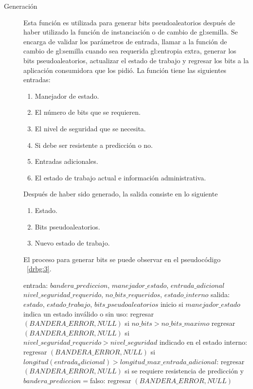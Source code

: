 \begin{description}
  \item [Generación] Esta función es utilizada para generar bits
    pseudoaleatorios después de haber utilizado la función de instanciación o
    de cambio de \gls{gl:semilla}. Se encarga de validar los parámetros de
    entrada, llamar a la función de cambio de \gls{gl:semilla} cuando sea
    requerida \gls{gl:entropia} extra, generar los bits pseudoaleatorios,
    actualizar el estado de trabajo y regresar los bits a la aplicación
    consumidora que los pidió. La función tiene las siguientes entradas:
    \begin{enumerate}
      \item Manejador de estado.
      \item El número de bits que se requieren.
      \item El nivel de seguridad que se necesita.
      \item Si debe ser resistente a predicción o no.
      \item Entradas adicionales.
      \item El estado de trabajo actual e información administrativa.
    \end{enumerate}
    Después de haber sido generado, la salida consiste en lo siguiente
    \begin{enumerate}
      \item Estado.
      \item Bits pseudoaleatorios.
      \item Nuevo estado de trabajo.
    \end{enumerate}
    El proceso para generar bits se puede observar en el pseudocódigo
   ~\ref{drbg:3}.
\begin{pseudocodigo}[caption={DRBG, generación.}, label={drbg:3}]
    entrada:  $bandera\_prediccion$, $manejador\_estado$, $entrada\_adicional$
              $nivel\_seguridad\_requerido$, $no\_bits\_requeridos$, $estado\_interno$
    salida:   $estado$, $estado\_trabajo$, $bits\_pseudoaleatorios$
    inicio
      si $manejador\_estado$ indica un estado inválido o sin uso:
        regresar $(BANDERA\_ERROR, NULL)$
      si $no\_bits > no\_bits\_maximo$
        regresar $(BANDERA\_ERROR, NULL)$
      si $nivel\_seguridad\_requerido > nivel\_seguridad$ indicado en el estado interno:
        regresar $(BANDERA\_ERROR, NULL)$
      si $longitud(entrada_adicional) > longitud\_max\_entrada\_adicional$:
        regresar $(BANDERA\_ERROR, NULL)$
      si se requiere resistencia de predicción y $bandera\_prediccion=$falso:
        regresar $(BANDERA\_ERROR, NULL)$

\end{pseudocodigo}
\end{description}

